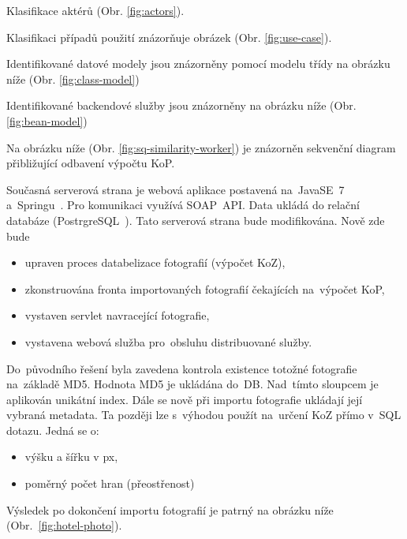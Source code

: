 
Klasifikace aktérů (Obr. \ref{fig:actors}).

Klasifikaci případů použití znázorňuje obrázek (Obr. \ref{fig:use-case}).



Identifikované datové modely jsou znázorněny pomocí modelu třídy na obrázku níže (Obr. \ref{fig:class-model})

Identifikované backendové služby jsou znázorněny na obrázku níže (Obr. \ref{fig:bean-model})


Na obrázku níže (Obr. \ref{fig:sq-similarity-worker}) je znázorněn sekvenční diagram přibližující odbavení výpočtu KoP.



Současná serverová strana je webová aplikace postavená na~JavaSE~7~\cite{java-se} a~Springu~\cite{spring}. Pro komunikaci využívá SOAP~API. Data ukládá do relační databáze (PostrgreSQL~\cite{postresql}). Tato serverová strana bude modifikována. Nově zde bude
\begin{itemize}
	\setlength{\parskip}{0pt}
	\setlength{\itemsep}{0pt}
	\item {upraven proces databelizace fotografií (výpočet KoZ),}
	\item {zkonstruována fronta importovaných fotografií čekajících na~výpočet KoP,}
	\item {vystaven servlet navracející fotografie,}
	\item {vystavena webová služba pro~obsluhu distribuované služby.}
\end{itemize}


Do~původního řešení byla zavedena kontrola existence totožné fotografie na~základě MD5. Hodnota MD5 je ukládána do~DB. Nad~tímto sloupcem je aplikován unikátní index. Dále se nově při importu fotografie ukládají její vybraná metadata. Ta později lze s~výhodou použít na~určení KoZ přímo v~SQL dotazu. Jedná se o:
\begin{itemize}
	\setlength{\parskip}{0pt}
	\setlength{\itemsep}{0pt}
	\item {výšku a šířku v px,}
	\item {poměrný počet hran (přeostřenost)}
\end{itemize}
Výsledek po dokončení importu fotografií je patrný na obrázku níže (Obr.~\ref{fig:hotel-photo}).

